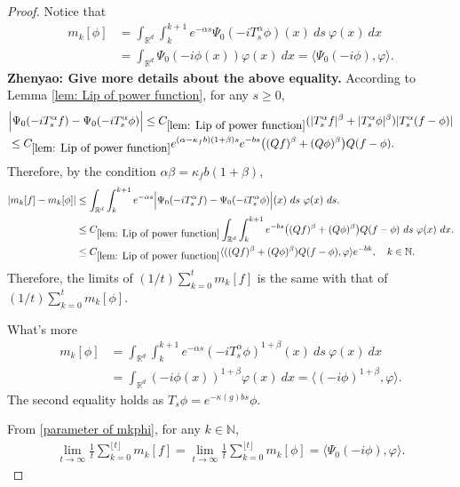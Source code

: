 \documentclass[12pt,oneside,english]{amsart}
\theoremstyle{plain}
\theoremstyle{definition}
\numberwithin{equation}{section}
\newcommand{\added}[1]{{\color{blue}#1}}\newcommand{\deleted}[1]{{\color{red}#1}}
\begin{document}
\begin{proof}
    \added{
    Notice that
        \begin{align}\label{parameter of mkphi}
        m_k[\phi]&=\int_{\mathbb{R}^d}\int_k^{k+1} e^{-\alpha s}\Psi_0(-iT_{s}^{\alpha}\phi)(x)~ds~\varphi(x)~dx\\
        &=\int_{\mathbb{R}^d}\Psi_0(-i\phi(x))\varphi (x)~dx=\langle \Psi_0(-i\phi),\varphi\rangle.
    \end{align}
    }
    {\bf Zhenyao: Give more details about the above equality.}
    \added{
    According to Lemma \ref{lem: Lip of power function}, for any $s\geq 0$,
    \begin{align}
        &\Big|\Psi_0(-iT^{\alpha}_s f)-\Psi_0(-iT^{\alpha}_s\phi)\Big|\leq C_{\ref{lem: Lip of power function}}(|T^{\alpha}_sf|^{\beta}+|T^{\alpha}_s\phi|^{\beta})|T^{\alpha}_s(f-\phi)|
        \\& \leq C_{\ref{lem: Lip of power function}}e^{(\alpha-\kappa_f b)(1+\beta)s}e^{-bs}\big((Qf)^{\beta}+(Q\phi)^{\beta}\big)Q(f-\phi).
    \end{align}
    Therefore, by the condition $\alpha\beta=\kappa_fb(1+\beta)$,
    \begin{align}
        |m_k[f]-m_k[\phi]|&\leq\int_{\mathbb{R}^d}\int_k^{k+1}e^{-\alpha s}\Big|\Psi_0(-iT^{\alpha}_s f)-\Psi_0(-iT^{\alpha}_s\phi)\Big|(x)~ds~\varphi(x)~ds.
        \\&\leq C_{\ref{lem: Lip of power function}}\int_{\mathbb{R}^d}\int_{k}^{k+1} e^{-bs}\big((Qf)^{\beta}+(Q\phi)^{\beta}\big)Q(f-\phi)~ds~ \varphi(x)~dx.
        \\&\leq C_{\ref{lem: Lip of power function}}\langle((Qf)^{\beta}+(Q\phi)^{\beta})Q(f-\phi), \varphi\rangle e^{-bk},\quad k \in \mathbb{N}.
    \end{align}
    Therefore, the limits of $(1/t)\sum_{k=0}^tm_k[f]$ is the same with that of $(1/t)\sum_{k=0}^tm_k[\phi]$.
    }
    
    \deleted{
    What's more
    \begin{align*}
        m_k[\phi]&=\int_{\mathbb{R}^d}\int_k^{k+1} e^{-\alpha s}(-iT_{s}^{\alpha}\phi)^{1+\beta}(x)~ds~\varphi(x)~dx\\
        &=\int_{\mathbb{R}^d}(-i\phi(x))^{1+\beta}\varphi (x)~dx=\langle (-i\phi)^{1+\beta},\varphi\rangle.
    \end{align*}
    The second equality holds as $T_s\phi=e^{-\kappa(g)bs}\phi$.
    }
    
    From \eqref{parameter of mkphi}, for any $k\in \mathbb{N}$,
    \begin{align}
        \lim_{t\rightarrow \infty}\frac{1}{t}\sum_{k=0}^{\lfloor t\rfloor}m_k[f]=\lim_{t\rightarrow \infty}\frac{1}{t}\sum_{k=0}^{\lfloor t \rfloor}m_k[\phi]=\langle\Psi_0(-i\phi),\varphi\rangle.
    \end{align}
    
\end{proof}
\end{document}
